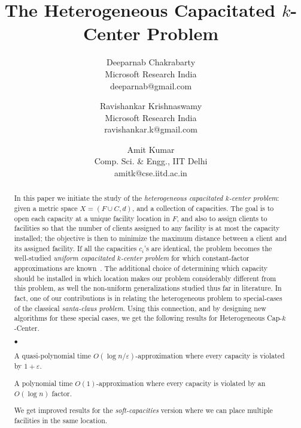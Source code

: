 \documentclass{article}[11pt]
\def\mckc{{\sffamily Heterogeneous Cap-$k$-Center}\xspace}
\renewcommand{\epsilon}{\varepsilon}
\newcommand{\initOneLiners}{%
    \setlength{\itemsep}{0pt}
    \setlength{\parsep }{0pt}
    \setlength{\topsep }{0pt}
%
}
\newenvironment{oneLiners}[1][\ensuremath{\bullet}]
    {\begin{list}
        {#1}
        {\initOneLiners}}
    {\end{list}}
\begin{document}
\title{The Heterogeneous Capacitated $k$-Center Problem}
\date{}
\author{Deeparnab Chakrabarty \\ \small Microsoft Research India\\\small  deeparnab@gmail.com \and Ravishankar Krishnaswamy \\ \small Microsoft Research India\\\small  ravishankar.k@gmail.com \and Amit Kumar \\ \small  Comp. Sci. \& Engg., IIT Delhi \\ \small amitk@cse.iitd.ac.in}
\maketitle
\begin{abstract}
	In this paper we initiate the study of the {\em heterogeneous capacitated $k$-center problem}: given a metric space $X = (F \cup C, d)$, and a collection of capacities. The goal is to open each capacity at a unique facility location in $F$, and also to assign clients to facilities so that the number of clients assigned to any facility is at most the capacity installed; the objective is then to minimize the maximum distance between a client and its assigned facility. If all the capacities $c_i$'s are identical, the problem becomes the well-studied {\em uniform capacitated $k$-center problem} for which constant-factor approximations are known~\cite{Bar-IlanKP93,KhullerS00}.
The additional choice of determining which capacity should be installed in which location makes our problem considerably different from this problem, as well the non-uniform generalizations studied thus far in literature. In fact, one of our contributions is in relating the heterogeneous problem to special-cases of the classical {\em santa-claus problem}. Using this connection, and by designing new algorithms for these special cases, we get the following results for \mckc.
\begin{oneLiners}
\item A quasi-polynomial time $O(\log n/\epsilon)$-approximation where every capacity is violated by $1+\epsilon$.
\item A polynomial time $O(1)$-approximation where every capacity is violated by an $O(\log n)$ factor.
\end{oneLiners}
We get improved results for the {\em soft-capacities} version where we can place multiple facilities in the same location.
\end{abstract}
\end{document}
